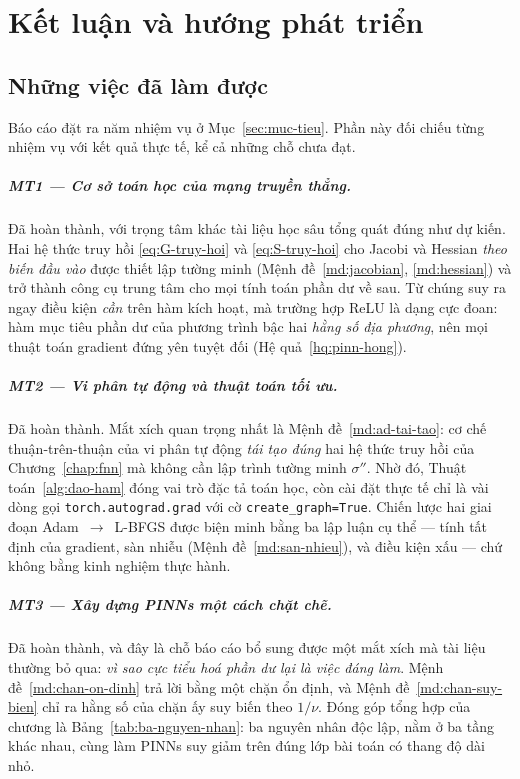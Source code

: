 \chapter{Kết luận và hướng phát triển}
\label{chap:ketluan}

\section{Những việc đã làm được}
\label{sec:da-lam}

Báo cáo đặt ra năm nhiệm vụ ở Mục~\ref{sec:muc-tieu}. Phần này đối chiếu từng
nhiệm vụ với kết quả thực tế, kể cả những chỗ chưa đạt.

\paragraph{MT1 --- Cơ sở toán học của mạng truyền thẳng.}
Đã hoàn thành, với trọng tâm khác tài liệu học sâu tổng quát đúng như dự kiến.
Hai hệ thức truy hồi \eqref{eq:G-truy-hoi} và \eqref{eq:S-truy-hoi} cho Jacobi và
Hessian \emph{theo biến đầu vào} được thiết lập tường minh
(Mệnh đề~\ref{md:jacobian}, \ref{md:hessian}) và trở thành công cụ trung tâm cho
mọi tính toán phần dư về sau. Từ chúng suy ra ngay điều kiện \emph{cần} trên hàm
kích hoạt, mà trường hợp ReLU là dạng cực đoan: hàm mục tiêu phần dư của phương
trình bậc hai \emph{hằng số địa phương}, nên mọi thuật toán gradient đứng yên
tuyệt đối (Hệ quả~\ref{hq:pinn-hong}).

\paragraph{MT2 --- Vi phân tự động và thuật toán tối ưu.}
Đã hoàn thành. Mắt xích quan trọng nhất là Mệnh đề~\ref{md:ad-tai-tao}: cơ chế
thuận-trên-thuận của vi phân tự động \emph{tái tạo đúng} hai hệ thức truy hồi của
Chương~\ref{chap:fnn} mà không cần lập trình tường minh $\sigma''$. Nhờ đó,
Thuật toán~\ref{alg:dao-ham} đóng vai trò đặc tả toán học, còn cài đặt thực tế
chỉ là vài dòng gọi \texttt{torch.autograd.grad} với cờ
\texttt{create\_graph=True}. Chiến lược hai giai đoạn Adam~$\to$~L-BFGS được biện
minh bằng ba lập luận cụ thể --- tính tất định của gradient, sàn nhiễu
(Mệnh đề~\ref{md:san-nhieu}), và điều kiện xấu --- chứ không bằng kinh nghiệm
thực hành.

\paragraph{MT3 --- Xây dựng PINNs một cách chặt chẽ.}
Đã hoàn thành, và đây là chỗ báo cáo bổ sung được một mắt xích mà tài liệu
thường bỏ qua: \emph{vì sao cực tiểu hoá phần dư lại là việc đáng làm}.
Mệnh đề~\ref{md:chan-on-dinh} trả lời bằng một chặn ổn định, và
Mệnh đề~\ref{md:chan-suy-bien} chỉ ra hằng số của chặn ấy suy biến theo $1/\nu$.
Đóng góp tổng hợp của chương là Bảng~\ref{tab:ba-nguyen-nhan}: ba nguyên nhân độc
lập, nằm ở ba tầng khác nhau, cùng làm PINNs suy giảm trên đúng lớp bài toán có
thang độ dài nhỏ.

